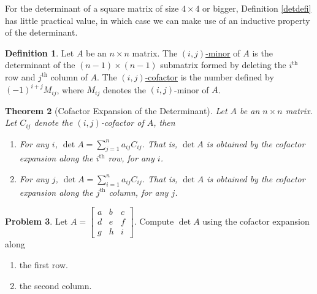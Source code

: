 \documentclass[12pt,letterpaper]{book}
\numberwithin{equation}{section}
\newtheorem{thm}{\textbf{Theorem}}[section]
\theoremstyle{definition}
\newtheorem{defi}[thm]{\textbf{Definition}}
\newtheorem{problem}[thm]{\textbf{Problem}}
\begin{document}
For the determinant of a square matrix of size $4\times 4$ or bigger, Definition \ref{detdefi} has little practical value, in which case we can make use of an inductive property of the determinant.

\begin{defi}
Let $A$ be an $n\times n$ matrix. The \underline{$(i,j)$-minor} of $A$ is the determinant of the $(n-1) \times (n-1)$ submatrix formed by deleting the $i^{\text{th}}$ row and $j^{\text{th}}$ column of $A$. The \underline{$(i,j)$-cofactor} is the number defined by $(-1)^{i+j}M_{ij}$, where $M_{ij}$ denotes the $(i,j)$-minor of $A$.
\end{defi}

\begin{thm}[Cofactor Expansion of the Determinant]
Let $A$ be an $n\times n$ matrix. Let $C_{ij}$ denote the $(i,j)$-cofactor of $A$, then
\begin{enumerate}
\item For any $i$, $\det A=\sum_{j=1}^n a_{ij}C_{ij}$. That is, $\det A$ is obtained by the cofactor expansion along the $i^{\text{th}}$ row, for any $i$.
\item For any $j$, $\det A=\sum_{i=1}^n a_{ij}C_{ij}$. That is, $\det A$ is obtained by the cofactor expansion along the $j^{\text{th}}$ column, for any $j$.
\end{enumerate}
\end{thm}

\begin{problem}
Let $A=\left[\begin{array}{ccc} a & b & c \\ d & e & f \\ g & h & i \end{array}\right]$. Compute $\det A$ using the cofactor expansion along
\begin{enumerate}
\item the first row.
\item the second column.
\end{enumerate}
\end{problem}
\end{document}
